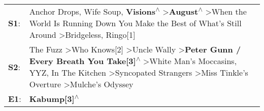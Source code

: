 \begin{supertabular}{p{0.03\textwidth}p{0.92\textwidth}}
 \textbf{S1}:  &                                                                                                                                                                 Anchor Drops\textsuperscript{}, \enspace Wife Soup\textsuperscript{}, \enspace \textbf{Visions\textsuperscript{$\wedge$}} \textgreater \enspace \textbf{August\textsuperscript{$\wedge$}} \textgreater \enspace When the World Is Running Down You Make the Best of What's Still Around\textsuperscript{} \textgreater \enspace Bridgeless\textsuperscript{}, \enspace Ringo[1]\textsuperscript{}  \enspace  \\
 \textbf{S2}:  &  The Fuzz\textsuperscript{} \textgreater \enspace Who Knows[2]\textsuperscript{} \textgreater \enspace Uncle Wally\textsuperscript{} \textgreater \enspace \textbf{Peter Gunn / Every Breath You Take[3]\textsuperscript{$\wedge$}} \textgreater \enspace White Man's Moccasins\textsuperscript{}, \enspace YYZ\textsuperscript{}, \enspace In The Kitchen\textsuperscript{} \textgreater \enspace Syncopated Strangers\textsuperscript{} \textgreater \enspace Miss Tinkle's Overture\textsuperscript{} \textgreater \enspace Mulche's Odyssey\textsuperscript{}  \enspace  \\
 \textbf{E1}:  &                                                                                                                                                                                                                                                                                                                                                                                                                                                                                                                      \textbf{Kabump[3]\textsuperscript{$\wedge$}}  \enspace  \\
\end{supertabular}
